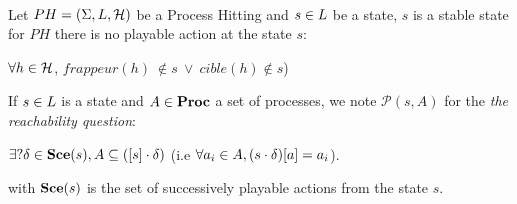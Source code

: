 \begin{definition}
 \\
\label{def:FixPoint2}
Let $PH = (\Sigma,L,\mathcal{H})$ be a Process Hitting and
$s \in L$ be a state, $s$ is a stable state for $PH$ there is no playable action at the state $s$: 
\begin{center}
$\forall h \in \mathcal{H}$, $frappeur(h) ~ \notin s ~ \vee ~ cible(h) \notin s$)
\end{center}
\end{definition}

\begin{definition}
\label{def:reachability}

 If $s \in L$ is a state and $A \in \mathbf{Proc}$ a set of processes, we note $\mathcal{P}(s, A)$ for the \emph{the reachability question}:
 \begin{center}
  $\exists? \delta \in \mathbf{Sce}(s), A \subseteq {([s]} \cdot \delta) $ (i.e $\forall a_i \in A, {(s \cdot \delta)[a]}=a_i$).
 \end{center}
with $\mathbf{Sce}(s)$ 
is the set of successively playable actions from the state $s$. 
\end{definition}


